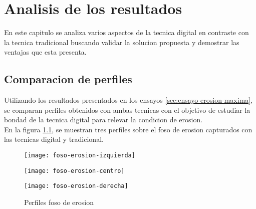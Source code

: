 \chapter{Analisis de los resultados}

En este capitulo se analiza varios aspectos de la tecnica digital en contraste con la tecnica tradicional buscando validar la solucion propuesta y demostrar las ventajas que esta presenta. \\ 

\section{Comparacion de perfiles}
Utilizando los resultados presentados en los ensayos \ref{sec:ensayo-erosion-maxima}, se comparan perfiles obtenidos con ambas tecnicas con el objetivo de estudiar la bondad de la tecnica digital para relevar la condicion de erosion. \\
En la figura \ref{fig:comparacion-perfiles}, se muestran tres perfiles sobre el foso de erosion capturados con las tecnicas digital y tradicional.\\

\begin{figure}[ht]
\centering
\begin{minipage}[h]{.45\textwidth}
\begin{center}
\texttt{[image: foso-erosion-izquierda]}
\end{center}
\end{minipage}
\hfill
\begin{minipage}[h]{.45\textwidth}
\begin{center}
\texttt{[image: foso-erosion-centro]}
\end{center}
\end{minipage}
\hfill
\begin{minipage}[h]{.45\textwidth}
\begin{center}
\texttt{[image: foso-erosion-derecha]}
\end{center}
\end{minipage}
\hfill
\caption[Perfiles foso de erosion]
{Perfiles foso de erosion}
\label{fig:comparacion-perfiles}
\end{figure}

